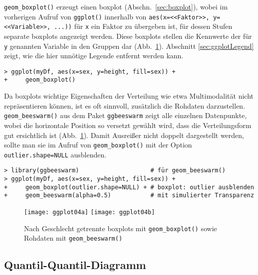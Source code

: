 \lstinline!geom_boxplot()! erzeugt einen boxplot (Abschn.\ \ref{sec:boxplot}), wobei im vorherigen Aufruf von \lstinline!ggplot()! innerhalb von \lstinline!aes(x=<<Faktor>>, y=<<Variable>>, ...))! für \lstinline!x! ein Faktor zu übergeben ist, für dessen Stufen separate boxplots angezeigt werden. Diese boxplots stellen die Kennwerte der für \lstinline!y! genannten Variable in den Gruppen dar (Abb.\ \ref{fig:ggplot04}). Abschnitt \ref{sec:ggplotLegend} zeigt, wie die hier unnötige Legende entfernt werden kann.
\begin{lstlisting}
> ggplot(myDf, aes(x=sex, y=height, fill=sex)) +
+     geom_boxplot()
\end{lstlisting}

Da boxplots wichtige Eigenschaften der Verteilung wie etwa Multimodalität nicht repräsentieren können, ist es oft sinnvoll, zusätzlich die Rohdaten darzustellen. \lstinline!geom_beeswarm()! aus dem Paket \lstinline!ggbeeswarm! \cite{Clarke2017} zeigt alle einzelnen Datenpunkte, wobei die horizontale Position so versetzt gewählt wird, dass die Verteilungsform gut ersichtlich ist (Abb.\ \ref{fig:ggplot04}). Damit Ausreißer nicht doppelt dargestellt werden, sollte man sie im Aufruf von \lstinline!geom_boxplot()! mit der Option \lstinline!outlier.shape=NULL! ausblenden.
\begin{lstlisting}
> library(ggbeeswarm)                    # für geom_beeswarm()
> ggplot(myDf, aes(x=sex, y=height, fill=sex)) +
+     geom_boxplot(outlier.shape=NULL) + # boxplot: outlier ausblenden
+     geom_beeswarm(alpha=0.5)           # mit simulierter Transparenz
\end{lstlisting}

\begin{figure}[ht]
\centering
\texttt{[image: ggplot04a]}
\texttt{[image: ggplot04b]}
\vspace*{-0.5em}
\caption{Nach Geschlecht getrennte boxplots mit \lstinline!geom_boxplot()! sowie Rohdaten mit \lstinline!geom_beeswarm()!}
\label{fig:ggplot04}
\end{figure}

\subsection{Quantil-Quantil-Diagramm}
\label{sec:ggplotQQ}

